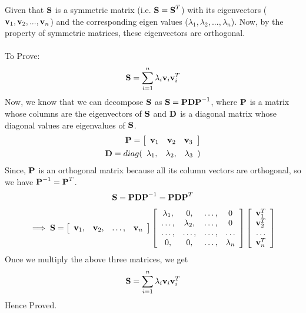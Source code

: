 \documentclass[12pt, a4paper]{article}
\begin{document}
Given that $\textbf{S}$ is a symmetric matrix (i.e. $\textbf{S} = \textbf{S}^T$) with its eigenvectors ($\textbf{v}_1,\textbf{v}_2, ..., \textbf{v}_n$) and the corresponding eigen values ($\lambda_1,\lambda_2, ..., \lambda_n$). Now, by the property of symmetric matrices, these eigenvectors are orthogonal. \\ \\
To Prove:
\begin{align*}
    \textbf{S} &= \sum_{i=1}^{n} \lambda_{i} \textbf{v}_i \textbf{v}^{T}_i\\
\end{align*}
Now, we know that we can decompose $\textbf{S}$ as $\textbf{S} = \textbf{P} \textbf{D} \textbf{P}^{-1}$, where $\textbf{P}$ is a matrix whose columns are the eigenvectors of $\textbf{S}$ and $\textbf{D}$ is a diagonal matrix whose diagonal values are eigenvalues of $\textbf{S}$.
\begin{align*}
    \textbf{P} = \left[ {\begin{array}{ccc}
        \textbf{v}_1 & \textbf{v}_2 & \textbf{v}_3
    \end{array} } \right] \\
    \textbf{D} = diag( {\begin{array}{ccc}
        \lambda_1 ,& \lambda_2 ,& \lambda_3
    \end{array} } )
\end{align*}
Since, $\textbf{P}$ is an orthogonal matrix because all its column vectors are orthogonal, so we have $\textbf{P}^{-1} = \textbf{P}^T$.
\begin{align*}
\textbf{S} = \textbf{P} \textbf{D} \textbf{P}^{-1} = \textbf{P} \textbf{D} \textbf{P}^{T}
\end{align*}
\begin{align*}
\implies \textbf{S} =
    \left[ {\begin{array}{cccc}
        \textbf{v}_1,& \textbf{v}_2,& \ldots,& \textbf{v}_n
    \end{array} } \right]
    \left[ {\begin{array}{cccc}
        \lambda_1 ,& 0 ,& \ldots ,& 0 \\
        \ldots ,& \lambda_2 ,& \ldots ,& 0 \\
        \ldots ,& \ldots ,& \ldots ,& \ldots \\
        0 ,& 0 ,& \ldots ,& \lambda_n
    \end{array} } \right]
    \left[ {\begin{array}{c}
        \textbf{v}_1^T \\
        \textbf{v}_2^T \\
        \ldots \\
        \textbf{v}_n^T
    \end{array} } \right]
\end{align*}
Once we multiply the above three matrices, we get
\begin{align*}
    \textbf{S} &= \sum_{i=1}^{n} \lambda_{i} \textbf{v}_i \textbf{v}^{T}_i\\
\end{align*}
Hence Proved.
\end{document}
